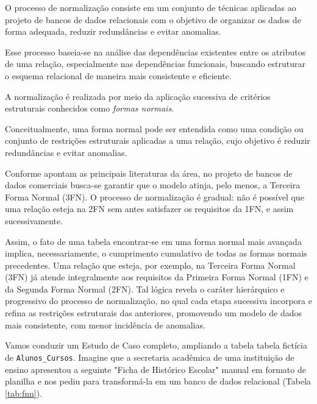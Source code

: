 O processo de normalização consiste em um conjunto de técnicas aplicadas ao projeto de bancos de dados relacionais com o objetivo de organizar os dados de forma adequada, reduzir redundâncias e evitar anomalias.

Esse processo baseia-se na análise das dependências existentes entre os atributos de uma relação, especialmente nas dependências funcionais, buscando estruturar o esquema relacional de maneira mais consistente e eficiente.

A normalização é realizada por meio da aplicação sucessiva de critérios estruturais conhecidos como \textit{formas normais}. 

Conceitualmente, uma forma normal pode ser entendida como uma condição ou conjunto de restrições estruturais aplicadas a uma relação, cujo objetivo é reduzir redundâncias e evitar anomalias.\cite{codd1971normalization}

Conforme apontam as principais literaturas da área, no projeto de bancos de dados comerciais busca-se garantir que o modelo atinja, pelo menos, a Terceira Forma Normal (3FN). O processo de normalização é gradual: não é possível que uma relação esteja na 2FN sem antes satisfazer os requisitos da 1FN, e assim sucessivamente.

Assim, o fato de uma tabela encontrar-se em uma forma normal mais avançada implica, necessariamente, o cumprimento cumulativo de todas as formas normais precedentes. Uma relação que esteja, por exemplo, na Terceira Forma Normal (3FN) já atende integralmente aos requisitos da Primeira Forma Normal (1FN) e da Segunda Forma Normal (2FN). Tal lógica revela o caráter hierárquico e progressivo do processo de normalização, no qual cada etapa sucessiva incorpora e refina as restrições estruturais das anteriores, promovendo um modelo de dados mais consistente, com menor incidência de anomalias.

Vamos conduzir um Estudo de Caso completo, ampliando a tabela tabela fictícia de \texttt{Alunos\_Cursos}. Imagine que a secretaria acadêmica de uma instituição de ensino apresentou a seguinte "Ficha de Histórico Escolar" manual em formato de planilha e nos pediu para transformá-la em um banco de dados relacional (Tabela \ref{tab:fnn}).

